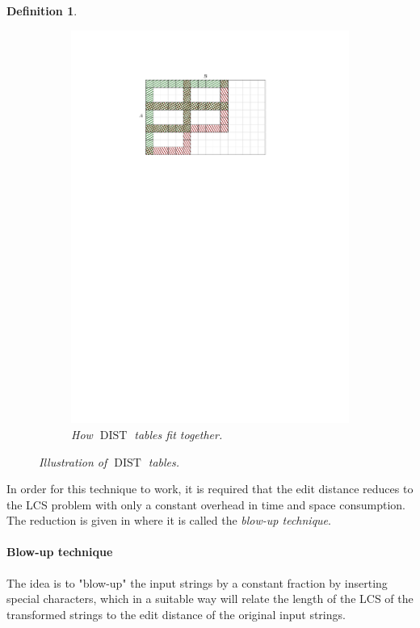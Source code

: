 \documentclass[twoside,11pt,openright]{report}
\newcommand{\DIST}{\operatorname{DIST}}
\newtheorem{mydef}{Definition}
\begin{document}
\begin{mydef}
\begin{figure}[h!]
\begin{subfigure}{0.45\textwidth}
      \includegraphics[width=\textwidth]{images/grid-dist-2}
      \caption{How $\DIST$ tables fit together.}
    \end{subfigure}
    \caption{Illustration of $\DIST$ tables.}
    \label{fig:defn-dist-table}
  \end{figure}
\end{mydef}

In order for this technique to work, it is required that the edit distance reduces to the LCS problem with only a constant overhead in time and space consumption. The reduction is given in \cite[p. 71]{DBLP:journals/corr/abs-0707-3619} where it is called the \textit{blow-up technique}.

\paragraph{Blow-up technique}
The idea is to "blow-up" the input strings by a constant fraction by inserting special characters, which in a suitable way will relate the length of the LCS of the transformed strings to the edit distance of the original input strings.
\end{document}
